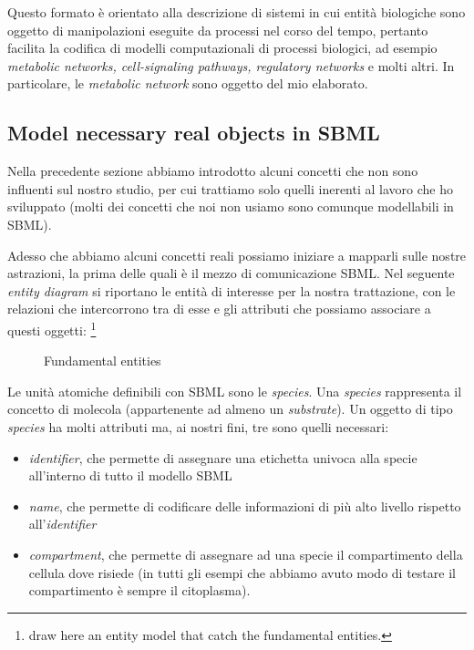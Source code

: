 Questo formato \`e orientato alla descrizione di sistemi in cui
entit\`a biologiche sono oggetto di manipolazioni eseguite da processi
nel corso del tempo, pertanto facilita la codifica di modelli
computazionali di processi biologici, ad esempio \emph{metabolic
  networks, cell-signaling pathways, regulatory networks} e molti
altri. In particolare, le \emph{metabolic network} sono oggetto del
mio elaborato.

\subsection{Model necessary real objects in SBML}
\label{sec:necessaryRealObjectsModeledInSBML}

Nella precedente sezione abbiamo introdotto alcuni concetti che non
sono influenti sul nostro studio, per cui trattiamo solo quelli
inerenti al lavoro che ho sviluppato (molti dei concetti che noi non
usiamo sono comunque modellabili in SBML).

Adesso che abbiamo alcuni concetti reali possiamo iniziare a mapparli
sulle nostre astrazioni, la prima delle quali \`e il mezzo di
comunicazione SBML. Nel seguente \emph{entity diagram} si riportano le
entit\`a di interesse per la nostra trattazione, con le relazioni che
intercorrono tra di esse e gli attributi che possiamo associare a
questi oggetti: \footnote{draw here an entity model that catch the
  fundamental entities.}
\begin{figure}
  \centering
  
  \caption{Fundamental entities}
  \label{fig:FundamentalEntities}
\end{figure}
Le unit\`a atomiche definibili con SBML sono le \emph{species}. Una
\emph{species} rappresenta il concetto di molecola (appartenente ad
almeno un \emph{substrate}).  Un oggetto di tipo \emph{species} ha
molti attributi ma, ai nostri fini, tre sono quelli necessari:
\begin{itemize}
\item \emph{identifier}, che permette di assegnare una etichetta univoca
alla specie all'interno di tutto il modello SBML
\item \emph{name}, che permette di codificare delle informazioni di
  pi\`u alto livello rispetto all'\emph{identifier}
\item \emph{compartment}, che permette di assegnare ad una specie il
compartimento della cellula dove risiede (in tutti gli esempi che
abbiamo avuto modo di testare il compartimento \`e sempre il
citoplasma).
\end{itemize}

